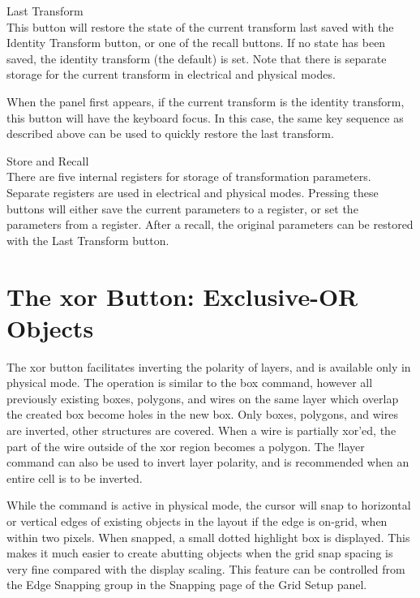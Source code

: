 \begin{description}
\item{\cb Last Transform}\\
This button will restore the state of the current transform last saved
with the {\cb Identity Transform} button, or one of the recall
buttons.  If no state has been saved, the identity transform (the
default) is set.  Note that there is separate storage for the current
transform in electrical and physical modes.

When the panel first appears, if the current transform is the identity
transform, this button will have the keyboard focus.  In this case,
the same key sequence as described above can be used to quickly restore
the last transform.

\item{Store and Recall}\\
There are five internal registers for storage of transformation
parameters.  Separate registers are used in electrical and physical
modes.  Pressing these buttons will either save the current parameters
to a register, or set the parameters from a register.  After a recall,
the original parameters can be restored with the {\cb Last Transform}
button.
\end{description}


\section{The {\cb xor} Button: Exclusive-OR Objects}

The {\cb xor} button facilitates inverting the polarity of layers, and
is available only in physical mode.  The operation is similar to the
{\cb box} command, however all previously existing boxes, polygons,
and wires on the same layer which overlap the created box become holes
in the new box.  Only boxes, polygons, and wires are inverted, other
structures are covered.  When a wire is partially xor'ed, the part of
the wire outside of the xor region becomes a polygon.  The {\cb
!layer} command can also be used to invert layer polarity, and is
recommended when an entire cell is to be inverted.

While the command is active in physical mode, the cursor will snap to
horizontal or vertical edges of existing objects in the layout if the
edge is on-grid, when within two pixels.  When snapped, a small dotted
highlight box is displayed.  This makes it much easier to create
abutting objects when the grid snap spacing is very fine compared with
the display scaling.  This feature can be controlled from the {\cb
Edge Snapping} group in the {\cb Snapping} page of the {\cb Grid
Setup} panel.

